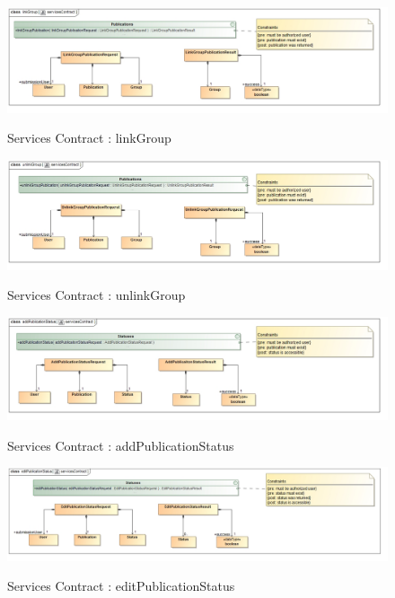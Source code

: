 \documentclass{article}
\begin{document}
		\begin{figure}[H]
		\includegraphics[width=\textwidth]{Quinton_Diagrams/class__linkGroup__servicesContract.jpg}  \\
		\caption{Services Contract : linkGroup}
		\end{figure}
		
		\begin{figure}[H]
		\includegraphics[width=\textwidth]{Quinton_Diagrams/class__unlinkGroup__servicesContract.jpg}  \\
		\caption{Services Contract : unlinkGroup}
		\end{figure}
		
		\begin{figure}[H]
		\includegraphics[width=\textwidth]{Quinton_Diagrams/class__addPublicationStatus__servicesContract.jpg}  \\
		\caption{Services Contract : addPublicationStatus}
		\end{figure}
		
		\begin{figure}[H]
		\includegraphics[width=\textwidth]{Quinton_Diagrams/class__editPublicationStatus__servicesContract.jpg}  \\
		\caption{Services Contract : editPublicationStatus}
		\end{figure}
		
\end{document}
